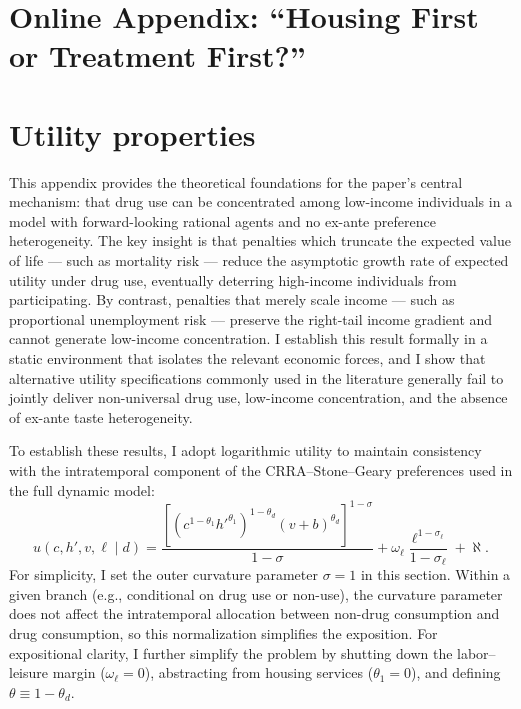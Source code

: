 \appendix
\setcounter{page}{1}
\setcounter{section}{0} %

\vspace{-3cm}
\section*{Online Appendix: ``Housing First or Treatment First?''}

\section{Utility properties}\label{app:proofs}

This appendix provides the theoretical foundations for the paper's central mechanism: that drug use can be concentrated among low-income individuals in a model with forward-looking rational agents and no ex-ante preference heterogeneity. The key insight is that penalties which truncate the expected value of life — such as mortality risk — reduce the asymptotic growth rate of expected utility under drug use, eventually deterring high-income individuals from participating. By contrast, penalties that merely scale income — such as proportional unemployment risk — preserve the right-tail income gradient and cannot generate low-income concentration. I establish this result formally in a static environment that isolates the relevant economic forces, and I show that alternative utility specifications commonly used in the literature generally fail to jointly deliver non-universal drug use, low-income concentration, and the absence of ex-ante taste heterogeneity.

To establish these results, I adopt logarithmic utility to maintain consistency with the intratemporal component of the CRRA--Stone--Geary preferences used in the full dynamic model:
\[
u\!\left(c,h',v,\ell \mid d\right)
=\frac{\left[(c^{1-\theta_1}h'^{\theta_1})^{1-\theta_{d}}(v+b)^{\theta_{d}}\right]^{1-\sigma}}{1-\sigma}
+\omega_\ell\frac{\ell^{1-\sigma_\ell}}{1-\sigma_\ell}+\aleph.
\]
For simplicity, I set the outer curvature parameter $\sigma=1$ in this section. Within a given branch (e.g., conditional on drug use or non-use), the curvature parameter does not affect the intratemporal allocation between non-drug consumption and drug consumption, so this normalization simplifies the exposition. For expositional clarity, I further simplify the problem by shutting down the labor--leisure margin ($\omega_\ell=0$), abstracting from housing services ($\theta_1=0$), and defining $\theta\equiv 1-\theta_d$.

